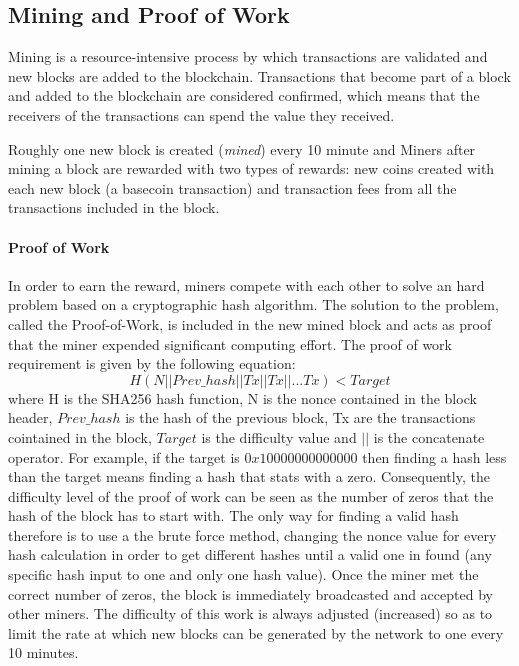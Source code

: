 \subsection{Mining and Proof of Work} Mining is a resource-intensive
process by which transactions are validated and new blocks are added to the
blockchain. Transactions that become part of a block and added to the blockchain
are considered confirmed, which means that the receivers of the transactions can
spend the value they received.

Roughly one new block is created (\emph{mined}) every 10 minute and Miners after
mining a block are rewarded with two types of rewards: new coins created with
each new block (a basecoin transaction) and transaction fees from all the
transactions included in the block.

\paragraph{Proof of Work} In order to earn the reward, miners compete with each
other to solve an hard problem based on a cryptographic hash algorithm. The
solution to the problem, called the Proof-of-Work, is included in the new mined
block and acts as proof that the miner expended significant computing effort.
The proof of work requirement is given by the following equation:
\begin{equation}
  H ( N || Prev\_hash || Tx || Tx || . . . Tx) < Target
\end{equation} where H is the SHA256 hash function, N is the nonce
contained in the block header, $Prev\_hash$ is the hash of the previous block,
Tx are the transactions cointained in the block, $Target$ is the difficulty
value and $||$ is the concatenate operator.
For example, if the target is $0x10000000000000$ then finding a hash less than
the target means finding a hash that stats with a zero. Consequently, the
difficulty level of the proof of work can be seen as the number of zeros that the
hash of the block has to start with. The only way for finding a valid hash therefore
is to use a the brute force method, changing the nonce value for every hash
calculation in order to get different hashes until a valid one in found
(any specific hash input to one and only one hash value).
Once the miner met the correct number of zeros, the block is immediately
broadcasted and accepted by other miners.
The difficulty of this work is always adjusted (increased) so as to limit the
rate at which new blocks can be generated by the network to one every 10 minutes.

